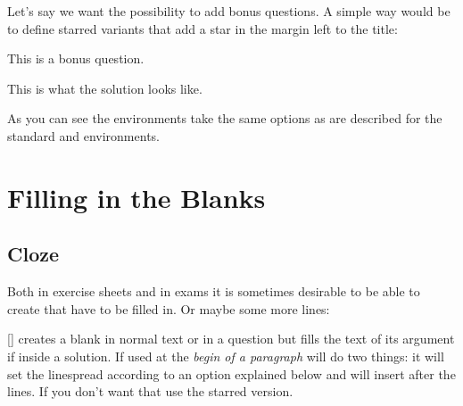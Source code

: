 \documentclass[load-preamble+]{cnltx-doc}
\DeclareRobustCommand*\questionstar{\texorpdfstring{\bonusquestionsign}{* }}
\DeclareRobustCommand*\bonusquestionsign{\llap{$\bigstar$\space}}
\begin{document}
Let's say we want the possibility to add bonus questions.  A simple way would
be to define starred variants that add a star in the margin left to the title:
\begin{example}
  \begin{question*}
    This is a bonus question.
  \end{question*}
  \begin{solution*}[print]
    This is what the solution looks like.
  \end{solution*}
\end{example}
As you can see the environments take the same options as are described for the
standard  and  environments.

\section{Filling in the Blanks}
\subsection{Cloze}
Both in exercise sheets and in exams it is sometimes
desirable to be able to create  that have to be filled in.  Or
maybe some more lines: \blank[width=5\linewidth]{}

\begin{commands}
  [\sarg{}]
    creates a blank in normal text or in a question but fills the text of its
    argument if inside a solution.  If used at the \emph{begin of a paragraph}
     will do two things: it will set the linespread according to an
    option explained below and will insert  after the lines.  If you
    don't want that use the starred version.
\end{commands}
\end{document}
